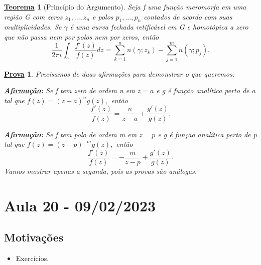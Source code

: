 \documentclass{article}
\newtheorem*{theorem*}{\underline{Teorema}}
\newtheorem*{proof*}{\underline{Prova}}
\begin{document}
 \hypertarget{argument-principle}{\begin{theorem*}[Princípio do Argumento]
  Seja f uma função meromorfa em uma região G com zeros \(z_{1},\dotsc ,z_{n}\) e polos \(p_{1},\dotsc , p_{n} \) contados
  de acordo com suas multiplicidades. Se \(\gamma \) é uma curva fechada retificável em G e homotópica a zero que não passa nem por polos
  nem por zeros, então 
  \[
    \frac{1}{2\pi i}\int_{\gamma }^{}\frac{f'(z)}{f(z)}dz = \sum\limits_{k=1}^{n}n(\gamma ; z_{k}) - \sum\limits_{j=1}^{m}n(\gamma ; p_{j}).
  \]
  \end{theorem*}}
  \begin{proof*}
    Precisamos de duas afirmações para demonstrar o que queremos:

  \textbf{\underline{Afirmação}:} Se f tem zero de ordem n em \(z=a\) e g é função analítica perto de a tal que \(f(z) = (z-a)^{n}g(z),\) então 
    \[
      \frac{f'(z)}{f(z)} = \frac{n}{z-a} + \frac{g'(z)}{g(z)}.
    \]

  \textbf{\underline{Afirmação}:} Se f tem polo de ordem m em \(z=p\) e g é função analítica perto de p tal que \(f(z) = (z-p)^{-m}g(z),\) então 
    \[
      \frac{f'(z)}{f(z)} = -\frac{m}{z-p} + \frac{g'(z)}{g(z)}.
    \]
  Vamos mostrar apenas a segunda, pois as provas são análogas.
  \end{proof*}
  \newpage

  \section{Aula 20 - 09/02/2023}
  \subsection{Motivações}
  \begin{itemize}
    \item Exercícios.
  \end{itemize}
  
\end{document}
